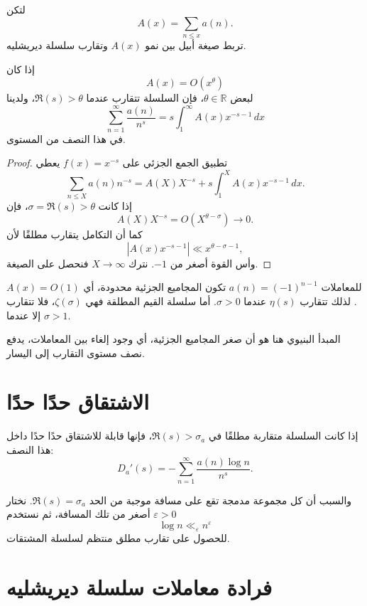 لتكن
\[
A(x)=\sum_{n\leq x}a(n).
\]
تربط صيغة أبيل بين نمو \(A(x)\) وتقارب سلسلة ديريشليه.

\begin{theorem}
\label{thm:dirichlet-series-abel-integral}
\provedhere
إذا كان
\[
A(x)=O(x^\theta)
\]
لبعض \(\theta\in\mathbb{R}\)، فإن السلسلة تتقارب عندما
\(\Re(s)>\theta\)، ولدينا
\[
\sum_{n=1}^{\infty}\frac{a(n)}{n^s}
=
s\int_1^{\infty}A(x)x^{-s-1}\,dx
\]
في هذا النصف من المستوى.
\end{theorem}

\begin{proof}
تطبيق الجمع الجزئي على \(f(x)=x^{-s}\) يعطي
\[
\sum_{n\leq X}a(n)n^{-s}
=
A(X)X^{-s}
+s\int_1^X A(x)x^{-s-1}\,dx.
\]
إذا كانت \(\sigma=\Re(s)>\theta\)، فإن
\[
A(X)X^{-s}=O(X^{\theta-\sigma})\longrightarrow0.
\]
كما أن التكامل يتقارب مطلقًا لأن
\[
|A(x)x^{-s-1}|
\ll x^{\theta-\sigma-1},
\]
وأس القوة أصغر من \(-1\). نترك \(X\to\infty\) فنحصل على الصيغة.
\end{proof}

\begin{example}
للمعاملات \(a(n)=(-1)^{n-1}\) تكون المجاميع الجزئية محدودة، أي
\(A(x)=O(1)\). لذلك تتقارب \(\eta(s)\) عندما \(\sigma>0\). أما سلسلة
القيم المطلقة فهي \(\zeta(\sigma)\)، فلا تتقارب إلا عندما \(\sigma>1\).
\end{example}

\begin{remark}
المبدأ البنيوي هنا هو أن صغر المجاميع الجزئية، أي وجود إلغاء بين
المعاملات، يدفع نصف مستوى التقارب إلى اليسار.
\end{remark}

\section{الاشتقاق حدًا حدًا}

إذا كانت السلسلة متقاربة مطلقًا في \(\Re(s)>\sigma_a\)، فإنها قابلة
للاشتقاق حدًا حدًا داخل هذا النصف:
\[
D_a'(s)
=
-\sum_{n=1}^{\infty}\frac{a(n)\log n}{n^s}.
\]

والسبب أن كل مجموعة مدمجة تقع على مسافة موجبة من الحد
\(\Re(s)=\sigma_a\). نختار \(\varepsilon>0\) أصغر من تلك المسافة، ثم
نستخدم
\[
\log n\ll_\varepsilon n^\varepsilon
\]
للحصول على تقارب مطلق منتظم لسلسلة المشتقات.

\section{فرادة معاملات سلسلة ديريشليه}

